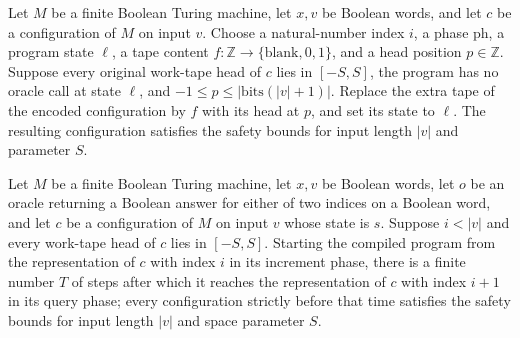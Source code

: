 \begin{theorem}
\label{Complexity.LogProg.OIS.index_fragment_safe}
\leanok
{}
Let $M$ be a finite Boolean Turing machine, let $x,v$ be Boolean words, and let $c$ be a
configuration of $M$ on input $v$. Choose a natural-number index $i$, a phase
$\mathrm{ph}$, a program state $\ell$, a tape content $f:\mathbb
Z\to\{\text{blank},0,1\}$, and a head position $p\in\mathbb Z$. Suppose every original
work-tape head of $c$ lies in $[-S,S]$, the program has no oracle call at state $\ell$,
and $-1\le p\le |\mathrm{bits}(|v|+1)|$. Replace the extra tape of the encoded
configuration by $f$ with its head at $p$, and set its state to $\ell$. The resulting
configuration satisfies the safety bounds for input length $|v|$ and parameter $S$.
\end{theorem}

\begin{theorem}
\label{Complexity.LogProg.OIS.index_inc}
\leanok
{}
Let $M$ be a finite Boolean Turing machine, let $x,v$ be Boolean words, let $o$ be an
oracle returning a Boolean answer for either of two indices on a Boolean word, and let
$c$ be a configuration of $M$ on input $v$ whose state is $s$. Suppose $i<|v|$ and every
work-tape head of $c$ lies in $[-S,S]$. Starting the compiled program from the
representation of $c$ with index $i$ in its increment phase, there is a finite number
$T$ of steps after which it reaches the representation of $c$ with index $i+1$ in its
query phase; every configuration strictly before that time satisfies the safety bounds
for input length $|v|$ and space parameter $S$.
\end{theorem}

